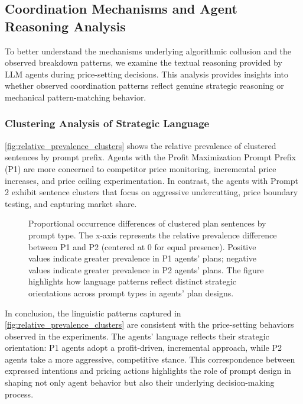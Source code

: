 \subsection{Coordination Mechanisms and Agent Reasoning Analysis}

To better understand the mechanisms underlying algorithmic collusion and the observed breakdown patterns, we examine the textual reasoning provided by LLM agents during price-setting decisions. This analysis provides insights into whether observed coordination patterns reflect genuine strategic reasoning or mechanical pattern-matching behavior.

\subsubsection*{Clustering Analysis of Strategic Language}
\autoref{fig:relative_prevalence_clusters} shows the relative prevalence of clustered sentences by prompt prefix. Agents with the Profit Maximization Prompt Prefix (P1) are more concerned to competitor price monitoring, incremental price increases, and price ceiling experimentation. In contrast, the agents with Prompt 2 exhibit sentence clusters that focus on aggressive undercutting, price boundary testing, and capturing market share.

\begin{figure}[htpb!]
    \centering
    
    \caption{Proportional occurrence differences of clustered plan sentences by prompt type. The x-axis represents the relative prevalence difference between P1 and P2 (centered at 0 for equal presence). Positive values indicate greater prevalence in P1 agents' plans; negative values indicate greater prevalence in P2 agents' plans. The figure highlights how language patterns reflect distinct strategic orientations across prompt types in agents' plan designs.}\label{fig:relative_prevalence_clusters}
\end{figure}

In conclusion, the linguistic patterns captured in \autoref{fig:relative_prevalence_clusters} are consistent with the price-setting behaviors observed in the experiments. The agents' language reflects their strategic orientation: P1 agents adopt a profit-driven, incremental approach, while P2 agents take a more aggressive, competitive stance. This correspondence between expressed intentions and pricing actions highlights the role of prompt design in shaping not only agent behavior but also their underlying decision-making process.

